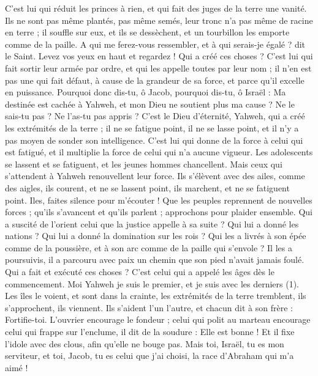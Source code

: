 \begin{multicols}{2}
{C'est lui qui réduit les princes à rien, et qui fait des juges de la terre une vanité.
Ils ne sont pas même plantés, pas même semés, leur tronc n’a pas même de racine en terre ; il souffle sur eux, et ils se dessèchent, et un tourbillon les emporte comme de la paille.
A qui me ferez-vous ressembler, et à qui serais-je égalé ? dit le Saint.
Levez vos yeux en haut et regardez ! Qui a créé ces choses ? C’est lui qui fait sortir leur armée par ordre, et qui les appelle toutes par leur nom ; il n’en est pas une qui fait défaut, à cause de la grandeur de sa force, et parce qu'il excelle en puissance.
Pourquoi donc dis-tu, ô Jacob, pourquoi dis-tu, ô Israël : Ma destinée est cachée à Yahweh, et mon Dieu ne soutient plus ma cause ?
Ne le sais-tu pas ? Ne l’as-tu pas appris ? C’est le Dieu d'éternité, Yahweh, qui a créé les extrémités de la terre ; il ne se fatigue point, il ne se lasse point, et il n'y a pas moyen de sonder son intelligence.
C'est lui qui donne de la force à celui qui est fatigué, et il multiplie la force de celui qui n'a aucune vigueur.
Les adolescents se lassent et se fatiguent, et les jeunes hommes chancellent.
Mais ceux qui s'attendent à Yahweh renouvellent leur force. Ils s’élèvent avec des ailes, comme des aigles, ils courent, et ne se lassent point, ils marchent, et ne se fatiguent point.
\VerseOne{}Iles, faites silence pour m’écouter ! Que les peuples reprennent de nouvelles forces ; qu'ils s’avancent et qu’ils parlent ; approchons pour plaider ensemble.
Qui a suscité de l’orient celui que la justice appelle à sa suite ? Qui lui a donné les nations ? Qui lui a donné la domination sur les rois ? Qui les a livrés à son épée comme de la poussière, et à son arc comme de la paille qui s’envole ?
Il les a poursuivis, il a parcouru avec paix un chemin que son pied n’avait jamais foulé.
Qui a fait et exécuté ces choses ? C’est celui qui a appelé les âges dès le commencement. Moi Yahweh je suis le premier, et je suis avec les derniers (1).
Les îles le voient, et sont dans la crainte, les extrémités de la terre tremblent, ils s’approchent, ils viennent.
Ils s’aident l’un l’autre, et chacun dit à son frère : Fortifie-toi.
L'ouvrier encourage le fondeur ; celui qui polit au marteau encourage celui qui frappe sur l'enclume, il dit de la soudure : Elle est bonne ! Et il fixe l’idole avec des clous, afin qu’elle ne bouge pas.
Mais toi, Israël, tu es mon serviteur, et toi, Jacob, tu es celui que j'ai choisi, la race d'Abraham qui m'a aimé !
}
\end{multicols}
